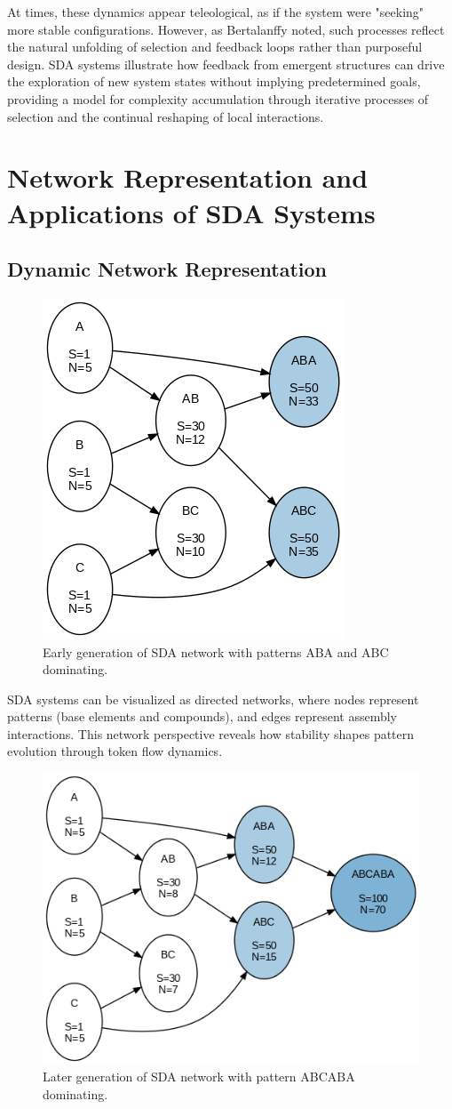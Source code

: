 \documentclass[preprint,12pt]{elsarticle}
\begin{document}
At times, these dynamics appear teleological, as if the system were "seeking" more stable configurations. However, as Bertalanffy \cite{bertalanffy1968general} noted, such processes reflect the natural unfolding of selection and feedback loops rather than purposeful design. SDA systems illustrate how feedback from emergent structures can drive the exploration of new system states without implying predetermined goals, providing a model for complexity accumulation through iterative processes of selection and the continual reshaping of local interactions.

\section{Network Representation and Applications of SDA Systems}

\subsection{Dynamic Network Representation}

\begin{figure}[h]
    \centering
    \includegraphics[width=0.4\linewidth]{figure_11.png}
    \caption{Early generation of SDA network with patterns ABA and ABC dominating.}
    \label{fig:figure_11}
\end{figure}

SDA systems can be visualized as directed networks, where nodes represent patterns (base elements and compounds), and edges represent assembly interactions. This network perspective reveals how stability shapes pattern evolution through token flow dynamics.

\begin{figure}[h]
    \centering
    \includegraphics[width=0.5\linewidth]{figure_12.png}
    \caption{Later generation of SDA network with pattern ABCABA dominating.}
    \label{fig:figure_12}
\end{figure}
\end{document}
